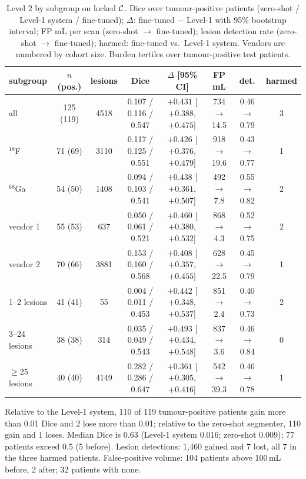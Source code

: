 \begin{table}[t]
\centering
\caption{Level 2 by subgroup on locked $\mathcal{C}$. Dice over tumour-positive patients (zero-shot / Level-1 system / fine-tuned); $\Delta$: fine-tuned $-$ Level-1 with 95\% bootstrap interval; FP mL per scan (zero-shot $\to$ fine-tuned); lesion detection rate (zero-shot $\to$ fine-tuned); harmed: fine-tuned vs.\ Level-1 system. Vendors are numbered by cohort size. Burden tertiles over tumour-positive test patients.}
\label{tab:supp_sub}
\footnotesize
\setlength{\tabcolsep}{4pt}
\begin{tabular}{@{}lccccccc@{}}
\toprule
subgroup & $n$ (pos.) & lesions & Dice & $\Delta$ {\scriptsize[95\% CI]} & FP mL & det. & harmed \\
\midrule
all & 125 (119) & 4518 & 0.107 / 0.116 / 0.547 & $+0.431$ {\scriptsize[$+0.388$, $+0.475$]} & 734$\to$14.5 & 0.46$\to$0.79 & 3 \\
$^{18}$F & 71 (69) & 3110 & 0.117 / 0.125 / 0.551 & $+0.426$ {\scriptsize[$+0.376$, $+0.479$]} & 918$\to$19.6 & 0.43$\to$0.77 & 1 \\
$^{68}$Ga & 54 (50) & 1408 & 0.094 / 0.103 / 0.541 & $+0.438$ {\scriptsize[$+0.361$, $+0.507$]} & 492$\to$7.8 & 0.55$\to$0.82 & 2 \\
vendor 1 & 55 (53) & 637 & 0.050 / 0.061 / 0.521 & $+0.460$ {\scriptsize[$+0.380$, $+0.532$]} & 868$\to$4.3 & 0.52$\to$0.75 & 2 \\
vendor 2 & 70 (66) & 3881 & 0.153 / 0.160 / 0.568 & $+0.408$ {\scriptsize[$+0.357$, $+0.455$]} & 628$\to$22.5 & 0.45$\to$0.79 & 1 \\
1--2 lesions & 41 (41) & 55 & 0.004 / 0.011 / 0.453 & $+0.442$ {\scriptsize[$+0.348$, $+0.537$]} & 851$\to$2.4 & 0.40$\to$0.73 & 2 \\
3--24 lesions & 38 (38) & 314 & 0.035 / 0.049 / 0.543 & $+0.493$ {\scriptsize[$+0.434$, $+0.548$]} & 837$\to$3.6 & 0.46$\to$0.84 & 0 \\
$\ge$25 lesions & 40 (40) & 4149 & 0.282 / 0.286 / 0.647 & $+0.361$ {\scriptsize[$+0.305$, $+0.416$]} & 542$\to$39.3 & 0.46$\to$0.78 & 1 \\
\bottomrule
\end{tabular}
\end{table}

 Relative to the Level-1 system, 110 of 119 tumour-positive patients gain more than 0.01 Dice and 2 lose more than 0.01; relative to the zero-shot segmenter, 110 gain and 1 loses. Median Dice is 0.63 (Level-1 system 0.016; zero-shot 0.009); 77 patients exceed 0.5 (5 before). Lesion detections: 1,460 gained and 7 lost, all 7 in the three harmed patients. False-positive volume: 104 patients above 100\,mL before, 2 after; 32 patients with none.

